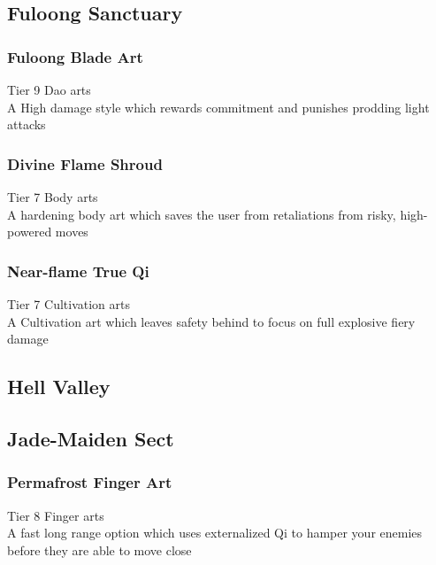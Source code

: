 \subsection{Fuloong Sanctuary}
\subsubsection{Fuloong Blade Art}
Tier 9 Dao arts\\
A High damage style which rewards commitment and punishes prodding light attacks

\subsubsection{Divine Flame Shroud}
Tier 7 Body arts \\
A hardening body art which saves the user from retaliations from risky, high-powered moves

\subsubsection{Near-flame True Qi}
Tier 7 Cultivation arts\\
A Cultivation art which leaves safety behind to focus on full explosive fiery damage

\subsection{Hell Valley} %
\subsubsection{}

\subsubsection{}

\subsubsection{}

\subsection{Jade-Maiden Sect}
\subsubsection{Permafrost Finger Art}
Tier 8 Finger arts\\
A fast long range option which uses externalized Qi to hamper your enemies before they are able to move close

